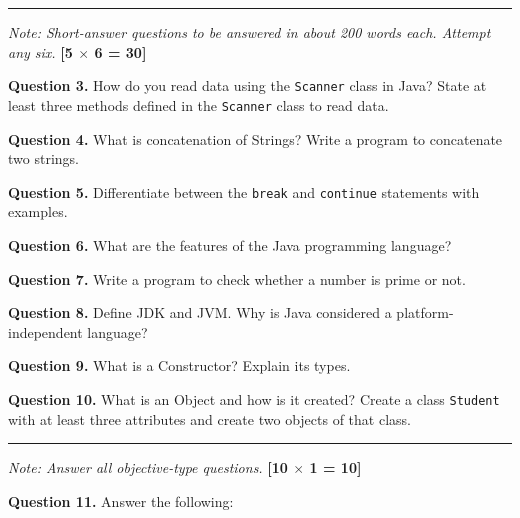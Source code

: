 \documentclass[11pt,a4paper]{article}
\begin{document}
\rule{\linewidth}{0.4pt}\smallskip




\noindent   \textit{Note: Short-answer questions to be answered in about 200 words each. Attempt any six.} \hfill   \textbf{[5 $ \times$ 6 = 30]}

\medskip


\noindent   \textbf{Question 3.} How do you read data using the   \texttt{Scanner} class in Java? State at least three methods defined in the   \texttt{Scanner} class to read data.

\medskip


\noindent   \textbf{Question 4.} What is concatenation of Strings? Write a program to concatenate two strings.

\medskip


\noindent   \textbf{Question 5.} Differentiate between the   \texttt{break} and   \texttt{continue} statements with examples.

\medskip


\noindent   \textbf{Question 6.} What are the features of the Java programming language?

\medskip


\noindent   \textbf{Question 7.} Write a program to check whether a number is prime or not.

\medskip


\noindent   \textbf{Question 8.} Define JDK and JVM. Why is Java considered a platform-independent language?

\medskip


\noindent   \textbf{Question 9.} What is a Constructor? Explain its types.

\medskip


\noindent   \textbf{Question 10.} What is an Object and how is it created? Create a class   \texttt{Student} with at least three attributes and create two objects of that class.

\bigskip


\rule{\linewidth}{0.4pt}\smallskip




\noindent   \textit{Note: Answer all objective-type questions.} \hfill   \textbf{[10 $ \times$ 1 = 10]}

\medskip


\noindent   \textbf{Question 11.} Answer the following:
\end{document}
